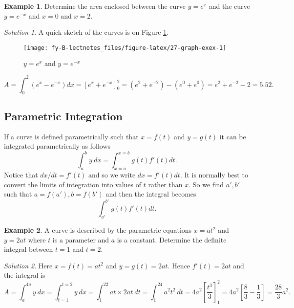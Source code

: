 \documentclass[
  11pt,
  oneside]{book}
\newcommand{\slide}{}
\theoremstyle{definition}
\theoremstyle{definition}
\newtheorem{example}{Example}[chapter]
\theoremstyle{definition}
\theoremstyle{definition}
\theoremstyle{remark}
\newtheorem*{solution}{Solution}
\begin{document}
\slide

\begin{example}
Determine the area enclosed between the curve \(y=e^x\) and the curve \(y=e^{-x}\) and \(x=0\) and \(x=2\).
\end{example}

\begin{solution}
\leavevmode

A quick sketch of the curves is on Figure \ref{fig:27-graph-exex}.

\begin{figure}

{\centering \texttt{[image: fy-B-lectnotes\_files/figure-latex/27-graph-exex-1]} 

}

\caption{$y=e^x$ and $y=e^{-x}$}\label{fig:27-graph-exex}
\end{figure}

\[
A = \int_0^2(e^x-e^{-x})dx = \left[e^x+e^{-x}\right]_0^2 = (e^2+e^{-2})-(e^0+e^0) = e^2+e^{-2}-2=5.52.
\]

\end{solution}

\slide

\subsection{Parametric Integration}\label{parametric-integration}

If a curve is defined parametrically such that \(x = f(t)\) and \(y = g(t)\) it can be integrated parametrically as follows
\[
\int_a^by\ dx = \int_{x=a}^{x=b}g(t)f'(t)dt.
\]
Notice that \(dx/dt = f'(t)\) and so we write \(dx = f'(t)dt\). It is normally best to convert the limits of integration into values of \(t\) rather than \(x\). So we find \(a', b'\) such that \(a=f(a'), b = f(b')\) and then the integral becomes
\[
\int_{a'}^{b'}g(t)f'(t)dt.
\]
\slide

\begin{example}
A curve is described by the parametric equations \(x = at^2\) and \(y = 2at\) where \(t\) is a parameter and \(a\) is a constant. Determine the definite integral between \(t = 1\) and \(t = 2\).
\end{example}

\begin{solution}
Here \(x=f(t)=at^2\) and \(y=g(t)=2at\). Hence \(f'(t) = 2at\) and the integral is
\[
A = \int_a^{4a} y\ dx = \int_{t=1}^{t=2}y\ dx = \int_1^22at\times 2at\ dt = \int_1^24a^2t^2\ dt = 4a^2\left[\frac{t^3}3\right]_1^2 = 4a^2\left[\frac 83-\frac13\right]=\frac{28}3a^2.
\]
\end{solution}
\end{document}
